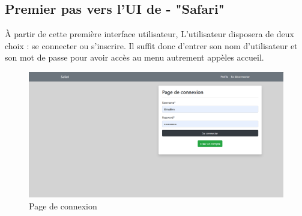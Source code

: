 \begin{enumerate}
 \section{Premier pas vers l'UI de - "Safari"}

À partir de cette première interface utilisateur, L’utilisateur disposera de deux choix : se connecter ou s’inscrire. Il suffit donc d’entrer son nom d'utilisateur et son mot de passe pour avoir accès au menu autrement appèles accueil.

\renewcommand{\thefigure}{7}

\begin{center}
    \begin{figure}[htbp]
        \centering
        \includegraphics[width=\textwidth, height=0.8\textheight]{images/connexion_first.png} 
        \caption{Page de connexion}
        \label{fig:C++}
    \end{figure}
\end{center}

  \paragraph{\\}
  
    \paragraph{\\}
    \paragraph{\\}
  
  \paragraph{\\}

\end{enumerate}
